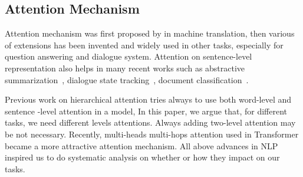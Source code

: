 \subsection{Attention Mechanism}
\label{ssec:sentential:attention}
Attention mechanism was first proposed by \citet{bahdanau2014neural}
in machine translation, then various of extensions has been invented
and widely used in other tasks, especially for question answering and
dialogue
system\cite{matchlstm,bidaf,sukhbaatar15mnet,fei17gmnet,P18-1157}.
Attention on sentence-level representation also helps in many recent
works such as abstractive summarization~\cite{P18-1013}, dialogue
state tracking~\cite{zhou2018multi,zhou2016multi}, document
classification~\cite{yang2016hierarchical}.

Previous work on hierarchical attention\cite{yang2016hierarchical}
tries always to use both word-level and sentence -level attention in a
model, In this paper, we argue that, for different tasks, we need
different levels attentions. Always adding two-level attention may be
not necessary.  Recently, multi-heads multi-hops attention used in
Transformer \cite{NIPS2017_7181} became a more attractive attention
mechanism. All above advances in NLP inspired us to do systematic
analysis on whether or how they impact on our tasks.

